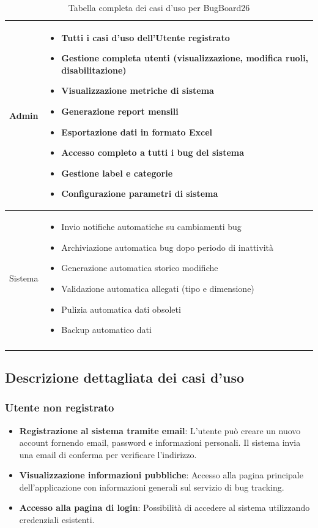 \begin{longtable}{|p{3cm}|p{11cm}|}
Admin &
\begin{itemize}[leftmargin=*,nosep,nolistsep]
    \item Tutti i casi d'uso dell'Utente registrato
    \item Gestione completa utenti (visualizzazione, modifica ruoli, disabilitazione)
    \item Visualizzazione metriche di sistema
    \item Generazione report mensili
    \item Esportazione dati in formato Excel
    \item Accesso completo a tutti i bug del sistema
    \item Gestione label e categorie
    \item Configurazione parametri di sistema
\end{itemize} \\
\hline

Sistema &
\begin{itemize}[leftmargin=*,nosep,nolistsep]
    \item Invio notifiche automatiche su cambiamenti bug
    \item Archiviazione automatica bug dopo periodo di inattività
    \item Generazione automatica storico modifiche
    \item Validazione automatica allegati (tipo e dimensione)
    \item Pulizia automatica dati obsoleti
    \item Backup automatico dati
\end{itemize} \\
\hline
\caption{Tabella completa dei casi d'uso per BugBoard26}
\label{tab:casi_uso}
\end{longtable}

\subsection{Descrizione dettagliata dei casi d'uso}

\subsubsection{Utente non registrato}
\begin{itemize}
    \item \textbf{Registrazione al sistema tramite email}: L'utente può creare un nuovo account fornendo email, password e informazioni personali. Il sistema invia una email di conferma per verificare l'indirizzo.
    \item \textbf{Visualizzazione informazioni pubbliche}: Accesso alla pagina principale dell'applicazione con informazioni generali sul servizio di bug tracking.
    \item \textbf{Accesso alla pagina di login}: Possibilità di accedere al sistema utilizzando credenziali esistenti.
\end{itemize}

